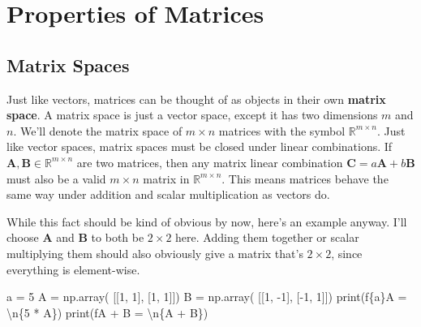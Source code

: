 \documentclass[
  letterpaper,
  DIV=11,
  numbers=noendperiod]{scrreprt}
\newenvironment{Shaded}{\begin{snugshade}}{\end{snugshade}}
\newcommand{\BuiltInTok}[1]{\textcolor[rgb]{0.00,0.23,0.31}{#1}}
\newcommand{\CharTok}[1]{\textcolor[rgb]{0.13,0.47,0.30}{#1}}
\newcommand{\DecValTok}[1]{\textcolor[rgb]{0.68,0.00,0.00}{#1}}
\newcommand{\NormalTok}[1]{\textcolor[rgb]{0.00,0.23,0.31}{#1}}
\newcommand{\OperatorTok}[1]{\textcolor[rgb]{0.37,0.37,0.37}{#1}}
\newcommand{\SpecialCharTok}[1]{\textcolor[rgb]{0.37,0.37,0.37}{#1}}
\newcommand{\SpecialStringTok}[1]{\textcolor[rgb]{0.13,0.47,0.30}{#1}}
\begin{document}
\hypertarget{properties-of-matrices}{%
\section{Properties of Matrices}\label{properties-of-matrices}}

\hypertarget{matrix-spaces}{%
\subsection{Matrix Spaces}\label{matrix-spaces}}

Just like vectors, matrices can be thought of as objects in their own
\textbf{matrix space}. A matrix space is just a vector space, except it
has two dimensions \(m\) and \(n\). We'll denote the matrix space of
\(m \times n\) matrices with the symbol \(\mathbb{R}^{m \times n}\).
Just like vector spaces, matrix spaces must be closed under linear
combinations. If \(\mathbf{A}, \mathbf{B} \in \mathbb{R}^{m \times n}\)
are two matrices, then any matrix linear combination
\(\mathbf{C} = a\mathbf{A} + b\mathbf{B}\) must also be a valid
\(m \times n\) matrix in \(\mathbb{R}^{m \times n}\). This means
matrices behave the same way under addition and scalar multiplication as
vectors do.

While this fact should be kind of obvious by now, here's an example
anyway. I'll choose \(\mathbf{A}\) and \(\mathbf{B}\) to both be
\(2 \times 2\) here. Adding them together or scalar multiplying them
should also obviously give a matrix that's \(2 \times 2\), since
everything is element-wise.

\begin{Shaded}
\begin{Highlighting}[]
\NormalTok{a }\OperatorTok{=} \DecValTok{5}
\NormalTok{A }\OperatorTok{=}\NormalTok{ np.array(}
\NormalTok{    [[}\DecValTok{1}\NormalTok{, }\DecValTok{1}\NormalTok{], }
\NormalTok{     [}\DecValTok{1}\NormalTok{, }\DecValTok{1}\NormalTok{]])}
\NormalTok{B }\OperatorTok{=}\NormalTok{ np.array(}
\NormalTok{    [[}\DecValTok{1}\NormalTok{, }\OperatorTok{{-}}\DecValTok{1}\NormalTok{], }
\NormalTok{     [}\OperatorTok{{-}}\DecValTok{1}\NormalTok{, }\DecValTok{1}\NormalTok{]])}
\BuiltInTok{print}\NormalTok{(}\SpecialStringTok{f\textquotesingle{}}\SpecialCharTok{\{}\NormalTok{a}\SpecialCharTok{\}}\SpecialStringTok{A = }\CharTok{\textbackslash{}n}\SpecialCharTok{\{}\DecValTok{5} \OperatorTok{*}\NormalTok{ A}\SpecialCharTok{\}}\SpecialStringTok{\textquotesingle{}}\NormalTok{)}
\BuiltInTok{print}\NormalTok{(}\SpecialStringTok{f\textquotesingle{}A + B = }\CharTok{\textbackslash{}n}\SpecialCharTok{\{}\NormalTok{A }\OperatorTok{+}\NormalTok{ B}\SpecialCharTok{\}}\SpecialStringTok{\textquotesingle{}}\NormalTok{)}
\end{Highlighting}
\end{Shaded}
\end{document}
